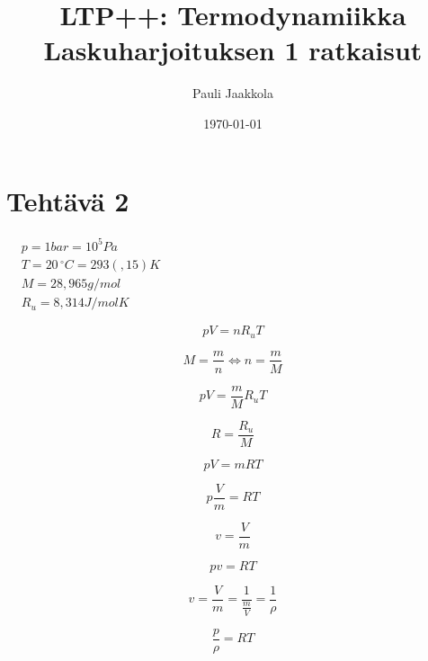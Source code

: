 \documentclass[12pt,a4paper,finnish]{article}
\title{LTP++: Termodynamiikka\\Laskuharjoituksen 1 ratkaisut}
\date{\today}
\author{Pauli Jaakkola}
\begin{document}
\maketitle
\tableofcontents

\section{Tehtävä 2}

\begin{math}
\begin{aligned}
 &p = 1bar = 10^5 Pa\\
 &T = 20\,^{\circ}C = 293(,15)K\\
 &M = 28,965 g/mol\\
 &R_u = 8,314 J/molK
\end{aligned}
\end{math}

\begin{equation}
 pV = nR_uT
\end{equation}

\begin{equation}
 M = \frac{m}{n} \Leftrightarrow n = \frac{m}{M}
\end{equation}

\begin{equation}
 pV = \frac{m}{M}R_uT
\end{equation}
 
\begin{equation}
R = \frac{R_u}{M}
\end{equation}

\begin{equation}
 pV = mRT
\end{equation}

\begin{equation}
 p\frac{V}{m} = RT
\end{equation}

\begin{equation}
v = \frac{V}{m}
\end{equation}

\begin{equation}
\label{eq:pvRT}
 pv = RT
\end{equation}

\begin{equation}
 v = \frac{V}{m} = \frac{1}{\frac{m}{V}} = \frac{1}{\rho}
\end{equation}

\begin{equation}
 \frac{p}{\rho} = RT
\end{equation}
\end{document}
